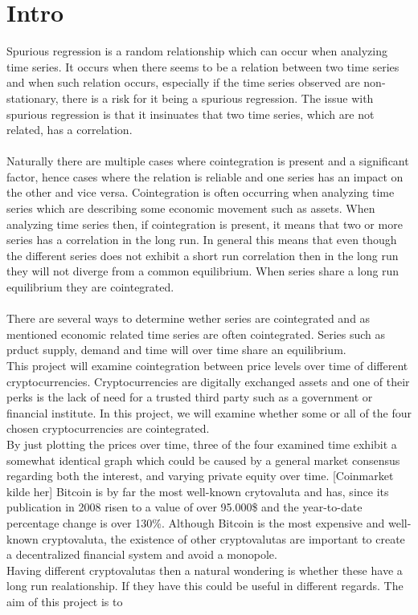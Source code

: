 \chapter{Intro}
Spurious regression is a random relationship which can occur when analyzing time series. It occurs when there seems to be a relation between two time series and when such relation occurs, especially if the time series observed are non-stationary, there is a risk for it being a spurious regression. The issue with spurious regression is that it insinuates that two time series, which are not related, has a correlation.\\\\
Naturally there are multiple cases where cointegration is present and a significant factor, hence cases where the relation is reliable and one series has an impact on the other and vice versa. Cointegration is often occurring when analyzing time series which are describing some economic movement such as assets. When analyzing time series then, if cointegration is present, it means that two or more series has a correlation in the long run. In general this means that even though the different series does not exhibit a short run correlation then in the long run they will not diverge from a common equilibrium. When series share a long run equilibrium they are cointegrated.\cite{Intro_cointegration}\\\\
There are several ways to determine wether series are cointegrated and as mentioned economic related time series are often cointegrated. Series such as prduct supply, demand and time will over time share an equilibrium.\\
This project will examine cointegration between price levels over time of different cryptocurrencies. Cryptocurrencies are digitally exchanged assets and one of their perks is the lack of need for a trusted third party such as a government or financial institute. In this project, we will examine whether some or all of the four chosen cryptocurrencies are cointegrated.\\
By just plotting the prices over time, three of the four examined time exhibit a somewhat identical graph which could be caused by a general market consensus regarding both the interest, and varying private equity over time. [Coinmarket kilde her] Bitcoin is by far the most well-known crytovaluta and has, since its publication in 2008 risen to a value of over 95.000\$ and the year-to-date percentage change is over 130\%. Although Bitcoin is the most expensive and well-known cryptovaluta, the existence of other cryptovalutas are important to create a decentralized financial system and avoid a monopole.\\
Having different cryptovalutas then a natural wondering is whether these have a long run realationship. If they have this could be useful in different regards. The aim of this project is to 



